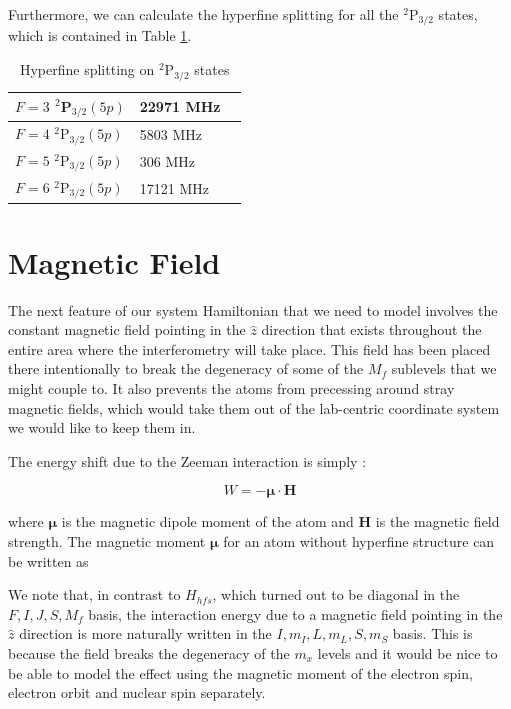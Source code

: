 Furthermore, we can calculate the hyperfine splitting for all the $^2$P$_{3/2}$ states, which is contained in Table \ref{tableOfHyperfine deetuings}.

\begin{table}[h]
\centering
\begin{tabular}{|l|l|||r|}
\hline
$F=3$ $^2$P$_{3/2} (5p)$ & 22971  MHz\\ \hline
$F=4$ $^2$P$_{3/2} (5p)$ &  5803 MHz\\ \hline
$F=5$ $^2$P$_{3/2} (5p)$ &  306 MHz\\ \hline
$F=6$ $^2$P$_{3/2} (5p)$ &   17121 MHz\\ \hline
\end{tabular}
\caption{Hyperfine splitting on $^2$P$_{3/2}$ states}
\label{tableOfHyperfine deetuings}
\end{table}

\section{Magnetic Field}\label{zeeman}

The next feature of our system Hamiltonian that we need to model involves the constant magnetic field pointing in the $\hat{z}$ direction that exists throughout the entire area where the interferometry will take place. This field has been placed there intentionally to break the degeneracy of some of the $M_f$ sublevels that we might couple to. It also prevents the atoms from precessing around stray magnetic fields, which would take them out of the lab-centric coordinate system we would like to keep them in.

The energy shift due to the Zeeman interaction is simply \cite{sobelman_spectra}: 

\begin{equation}
W=-\mathbf{\mu}\cdot\mathbf{H}
\end{equation}

where $\mathbf{\mu}$ is the magnetic dipole moment of the atom and $\mathbf{H}$ is the magnetic field strength. The magnetic moment $\mathbf{\mu}$ for an atom without hyperfine structure can be written as \cite{sobelman_spectra}

We note that, in contrast to $H_{hfs}$, which turned out to be diagonal in the $F,I,J,S,M_f$ basis, the interaction energy due to a magnetic field pointing in the $\hat{z}$ direction is more naturally written in the $I,m_I, L,m_L,S,m_S$ basis. This is because the field breaks the degeneracy of the $m_x$ levels and it would be nice to be able to model the effect using the magnetic moment of the electron spin, electron orbit and nuclear spin separately. 

